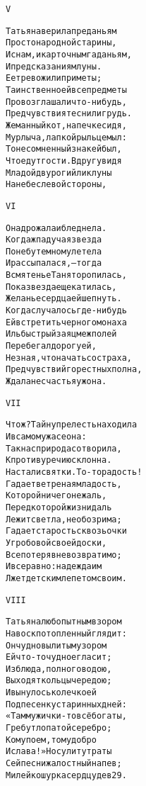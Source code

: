 \begin{minipage}[t]{\dimexpr 0.5\textwidth -\tabcolsep-.5pt}
\begin{alltt}\normalfont\centering
V

Татьяна верила преданьям
Простонародной старины,
И снам, и карточным гаданьям,
И предсказаниям луны.
Ее тревожили приметы;
Таинственно ей все предметы
Провозглашали что-нибудь,
Предчувствия теснили грудь.
Жеманный кот, на печке сидя,
Мурлыча, лапкой рыльце мыл:
То несомненный знак ей был,
Что едут гости. Вдруг увидя
Младой двурогий лик луны
На небе с левой стороны,
\end{alltt}
\end{minipage}

\begin{minipage}[t]{\dimexpr 0.5\textwidth -\tabcolsep-.5pt}
\begin{alltt}\normalfont\centering
VI

Она дрожала и бледнела.
Когда ж падучая звезда
По небу темному летела
И рассыпалася, — тогда
В смятенье Таня торопилась,
Пока звезда еще катилась,
Желанье сердца ей шепнуть.
Когда случалось где-нибудь
Ей встретить черного монаха
Иль быстрый заяц меж полей
Перебегал дорогу ей,
Не зная, что начать со страха,
Предчувствий горестных полна,
Ждала несчастья уж она.
\end{alltt}
\end{minipage}
\clearpage

\begin{minipage}[t]{\dimexpr 0.5\textwidth -\tabcolsep-.5pt}
\begin{alltt}\normalfont\centering
VII

Что ж? Тайну прелесть находила
И в самом ужасе она:
Так нас природа сотворила,
К противуречию склонна.
Настали святки. То-то радость!
Гадает ветреная младость,
Которой ничего не жаль,
Перед которой жизни даль
Лежит светла, необозрима;
Гадает старость сквозь очки
У гробовой своей доски,
Все потеряв невозвратимо;
И все равно: надежда им
Лжет детским лепетом своим.
\end{alltt}
\end{minipage}

\begin{minipage}[t]{\dimexpr 0.5\textwidth -\tabcolsep-.5pt}
\begin{alltt}\normalfont\centering
VIII

Татьяна любопытным взором
На воск потопленный глядит:
Он чудно вылитым узором
Ей что-то чудное гласит;
Из блюда, полного водою,
Выходят кольцы чередою;
И вынулось колечко ей
Под песенку старинных дней:
«Там мужички-то всё богаты,
Гребут лопатой серебро;
Кому поем, тому добро
И слава!» Но сулит утраты
Сей песни жалостный напев;
Милей кошурка сердцу дев 29.
\end{alltt}
\end{minipage}
\clearpage

